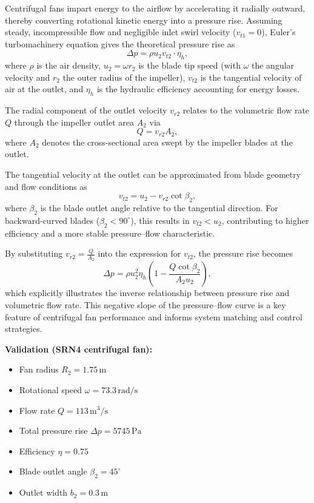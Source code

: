 Centrifugal fans impart energy to the airflow by accelerating it radially outward, thereby converting rotational kinetic energy into a pressure rise. Assuming steady, incompressible flow and negligible inlet swirl velocity (\( v_{t1} = 0 \)), Euler’s turbomachinery equation gives the theoretical pressure rise as
\begin{equation}
    \Delta p = \rho u_2 v_{t2} \cdot \eta_h,
\end{equation}
where \( \rho \) is the air density, \( u_2 = \omega r_2 \) is the blade tip speed (with \( \omega \) the angular velocity and \( r_2 \) the outer radius of the impeller), \( v_{t2} \) is the tangential velocity of air at the outlet, and \( \eta_h \) is the hydraulic efficiency accounting for energy losses.

The radial component of the outlet velocity \( v_{r2} \) relates to the volumetric flow rate \( Q \) through the impeller outlet area \( A_2 \) via
\begin{equation}
    Q = v_{r2} A_2,
\end{equation}
where \( A_2 \) denotes the cross-sectional area swept by the impeller blades at the outlet.

The tangential velocity at the outlet can be approximated from blade geometry and flow conditions as
\begin{equation}
    v_{t2} = u_2 - v_{r2} \cot \beta_2,
\end{equation}
where \( \beta_2 \) is the blade outlet angle relative to the tangential direction. For backward-curved blades (\( \beta_2 < 90^\circ \)), this results in \( v_{t2} < u_2 \), contributing to higher efficiency and a more stable pressure–flow characteristic.

By substituting \( v_{r2} = \frac{Q}{A_2} \) into the expression for \( v_{t2} \), the pressure rise becomes
\begin{equation}
    \boxed{\Delta p = \rho u_2^2 \eta_h \left(1 - \frac{Q \cot \beta_2}{A_2 u_2} \right)},
\end{equation}
which explicitly illustrates the inverse relationship between pressure rise and volumetric flow rate. This negative slope of the pressure–flow curve is a key feature of centrifugal fan performance and informs system matching and control strategies.


\textbf{Validation (SRN4 centrifugal fan):}~\cite{yun1990hovercraft}
\begin{itemize}
    \item Fan radius \( R_2 = 1.75\, \mathrm{m} \)
    \item Rotational speed \( \omega = 73.3\, \mathrm{rad/s} \)
    \item Flow rate \( Q = 113\, \mathrm{m^3/s} \)
    \item Total pressure rise \( \Delta p = 5745\, \mathrm{Pa} \)
    \item Efficiency \( \eta = 0.75 \)
    \item Blade outlet angle \( \beta_2 = 45^\circ \) 
    \item Outlet width \( b_2 = 0.3\, \mathrm{m} \)
\end{itemize}

